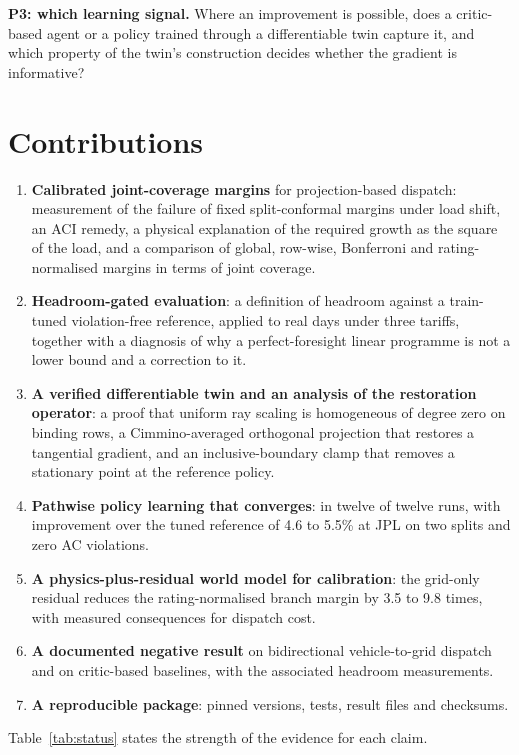 \documentclass[11pt]{article}
\begin{document}
\textbf{P3: which learning signal.} Where an improvement is possible, does a critic-based agent or a policy trained through a differentiable twin capture it, and which property of the twin's construction decides whether the gradient is informative?

\section{Contributions}\label{sec:contrib}
\begin{enumerate}
\item \textbf{Calibrated joint-coverage margins} for projection-based dispatch: measurement of the failure of fixed split-conformal margins under load shift, an ACI remedy, a physical explanation of the required growth as the square of the load, and a comparison of global, row-wise, Bonferroni and rating-normalised margins in terms of joint coverage.
\item \textbf{Headroom-gated evaluation}: a definition of headroom against a train-tuned violation-free reference, applied to real days under three tariffs, together with a diagnosis of why a perfect-foresight linear programme is not a lower bound and a correction to it.
\item \textbf{A verified differentiable twin and an analysis of the restoration operator}: a proof that uniform ray scaling is homogeneous of degree zero on binding rows, a Cimmino-averaged orthogonal projection that restores a tangential gradient, and an inclusive-boundary clamp that removes a stationary point at the reference policy.
\item \textbf{Pathwise policy learning that converges}: in twelve of twelve runs, with improvement over the tuned reference of 4.6 to 5.5\% at JPL on two splits and zero AC violations.
\item \textbf{A physics-plus-residual world model for calibration}: the grid-only residual reduces the rating-normalised branch margin by 3.5 to 9.8 times, with measured consequences for dispatch cost.
\item \textbf{A documented negative result} on bidirectional vehicle-to-grid dispatch and on critic-based baselines, with the associated headroom measurements.
\item \textbf{A reproducible package}: pinned versions, tests, result files and checksums.
\end{enumerate}
Table~\ref{tab:status} states the strength of the evidence for each claim.
\end{document}
